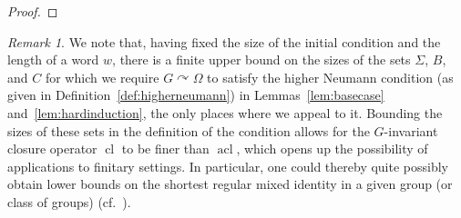 \documentclass{article}
\theoremstyle{remark}
\newtheorem{remark}[theorem]{Remark}
\theoremstyle{definition}
\def\acts{\curvearrowright}
\newcommand{\remmic}[1]{\textcolor{orange}{MP: #1}}
\newcommand{\repau}[1]{\textcolor{ForestGreen}{PM: #1}}
\DeclareMathOperator{\rk}{rk}
\DeclareMathOperator{\cl}{cl}
\DeclareMathOperator{\acl}{acl}
\def\Ind#1#2{#1\setbox0=\hbox{$#1x$}\kern\wd0\hbox to 0pt{\hss$#1\mid$\hss}
	\lower.9\ht0\hbox to 0pt{\hss$#1\smile$\hss}\kern\wd0}
\def\ind{\mathop{\mathpalette\Ind{}}}
\begin{document}
{\begin{proof}
\end{proof}

\begin{remark} {We note that, having fixed the size of the initial condition and the length of a word $w$, there is a finite upper bound on the sizes of the sets $\Sigma$, $B$, and $C$ for which we require $G\acts\Omega$ to satisfy the higher Neumann condition (as given in Definition~\ref{def:higherneumann}) in  Lemmas~\ref{lem:basecase} and~\ref{lem:hardinduction},
the only {places where}
we appeal to it. Bounding the sizes of these sets in the definition of the condition allows for the $G$-invariant closure operator $\cl$ to be finer than $\acl$, which opens up the possibility of applications to finitary settings. In particular,
 one could thereby quite possibly obtain %
 lower bounds on the shortest regular mixed identity in a given group (or class of groups) (cf.~\cite{bradford2023non, schneider2024word}).}
\end{remark}

}
\end{document}
